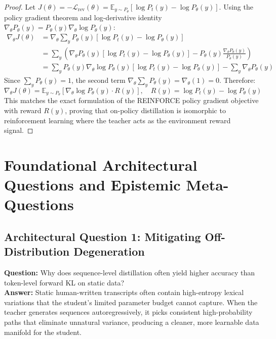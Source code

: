 \documentclass[11pt,a4paper]{article}
\theoremstyle{definition}
\begin{document}
\begin{proof}
Let $J(\theta) = - \mathcal{L}_{\text{rev}}(\theta) = \mathbb{E}_{y \sim P_\theta}[\log P_t(y) - \log P_\theta(y)]$.
Using the policy gradient theorem and log-derivative identity $\nabla_\theta P_\theta(y) = P_\theta(y) \nabla_\theta \log P_\theta(y)$:
{\boldmath
\begin{align}
\nabla_\theta J(\theta) &= \nabla_\theta \sum_{y} P_\theta(y) \left[ \log P_t(y) - \log P_\theta(y) \right] \\
&= \sum_{y} \left( \nabla_\theta P_\theta(y) \left[ \log P_t(y) - \log P_\theta(y) \right] - P_\theta(y) \frac{\nabla_\theta P_\theta(y)}{P_\theta(y)} \right) \\
&= \sum_{y} P_\theta(y) \nabla_\theta \log P_\theta(y) \left[ \log P_t(y) - \log P_\theta(y) \right] - \sum_{y} \nabla_\theta P_\theta(y)
\end{align}
}
Since $\sum_y P_\theta(y) = 1$, the second term $\nabla_\theta \sum_y P_\theta(y) = \nabla_\theta(1) = 0$.
Therefore:
{\boldmath
\begin{equation}
\nabla_\theta J(\theta) = \mathbb{E}_{y \sim P_\theta} \left[ \nabla_\theta \log P_\theta(y) \cdot R(y) \right], \quad R(y) = \log P_t(y) - \log P_\theta(y)
\end{equation}
}
This matches the exact formulation of the REINFORCE policy gradient objective with reward $R(y)$, proving that on-policy distillation is isomorphic to reinforcement learning where the teacher acts as the environment reward signal.
\end{proof}

\section{Foundational Architectural Questions and Epistemic Meta-Questions}

\subsection{Architectural Question 1: Mitigating Off-Distribution Degeneration}
\textbf{Question:} Why does sequence-level distillation often yield higher accuracy than token-level forward KL on static data?\\
\textbf{Answer:} Static human-written transcripts often contain high-entropy lexical variations that the student's limited parameter budget cannot capture. When the teacher generates sequences autoregressively, it picks consistent high-probability paths that eliminate unnatural variance, producing a cleaner, more learnable data manifold for the student.
\end{document}
